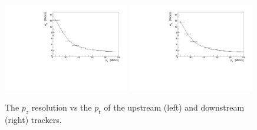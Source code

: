   \begin{figure}[p]
   \begin{center}
     \includegraphics[width=0.49\textwidth, angle=0]{08-Performance/upstream_pz_resolution_pt.pdf}
     \includegraphics[width=0.49\textwidth, angle=0]{08-Performance/downstream_pz_resolution_pt.pdf}
     \caption{\label{fig:PtPzResolKalman} The $p_z$ resolution vs the $p_{t}$ of the upstream (left) and downstream (right) trackers.}
   \end{center}
  \end{figure}

